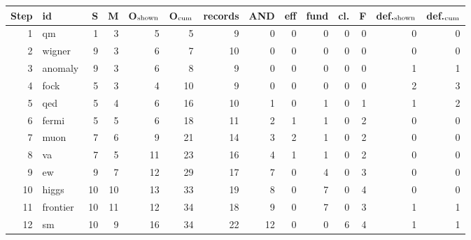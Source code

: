 {\setlength{\tabcolsep}{3.5pt}\begin{tabular}{@{}rlrrrrrrrrrrrr@{}}\toprule
Step & id & S & M & O$_{\rm shown}$ & O$_{\rm cum}$ & records & AND & eff & fund & cl. & F & def.$_{\rm shown}$ & def.$_{\rm cum}$ \\\midrule
1 & qm & 1 & 3 & 5 & 5 & 9 & 0 & 0 & 0 & 0 & 0 & 0 & 0 \\
2 & wigner & 9 & 3 & 6 & 7 & 10 & 0 & 0 & 0 & 0 & 0 & 0 & 0 \\
3 & anomaly & 9 & 3 & 6 & 8 & 9 & 0 & 0 & 0 & 0 & 0 & 1 & 1 \\
4 & fock & 5 & 3 & 4 & 10 & 9 & 0 & 0 & 0 & 0 & 0 & 2 & 3 \\
5 & qed & 5 & 4 & 6 & 16 & 10 & 1 & 0 & 1 & 0 & 1 & 1 & 2 \\
6 & fermi & 5 & 5 & 6 & 18 & 11 & 2 & 1 & 1 & 0 & 2 & 0 & 0 \\
7 & muon & 7 & 6 & 9 & 21 & 14 & 3 & 2 & 1 & 0 & 2 & 0 & 0 \\
8 & va & 7 & 5 & 11 & 23 & 16 & 4 & 1 & 1 & 0 & 2 & 0 & 0 \\
9 & ew & 9 & 7 & 12 & 29 & 17 & 7 & 0 & 4 & 0 & 3 & 0 & 0 \\
10 & higgs & 10 & 10 & 13 & 33 & 19 & 8 & 0 & 7 & 0 & 4 & 0 & 0 \\
11 & frontier & 10 & 11 & 12 & 34 & 18 & 9 & 0 & 7 & 0 & 3 & 1 & 1 \\
12 & sm & 10 & 9 & 16 & 34 & 22 & 12 & 0 & 0 & 6 & 4 & 1 & 1 \\
\bottomrule\end{tabular}}
